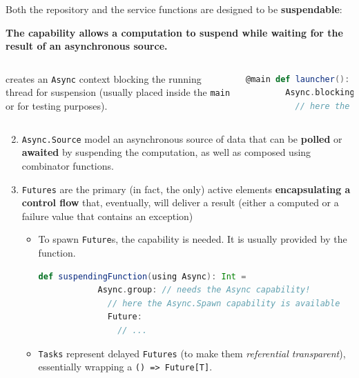 \documentclass[aspectratio=1610,xcolor=dvipsnames,handout]{beamer}
\begin{document}
\begin{frame}[fragile] %
  \small
  Both the repository and the service functions are designed to be \textbf{suspendable}:
  \begin{block}{}
    \textbf{The  capability allows a computation to suspend while waiting for the result of an asynchronous source.}
  \end{block}
  
  \pause
  \begin{columns}
       creates an \texttt{Async} context blocking the running thread for suspension (usually placed inside the \texttt{main} or for testing purposes).
    \begin{lstlisting}[language=scala,gobble=6]
      @main def launcher(): Unit =
        Async.blocking:
          // here the Async capability is available
    \end{lstlisting}
  \end{columns}
\end{frame}
%
\begin{frame}[fragile]
  \begin{block}{}
    \begin{enumerate}
      \setcounter{enumi}{1}
      \item \texttt{Async.Source} model an asynchronous source of data that can be \textbf{polled} or \textbf{awaited} by suspending the computation, as well as composed using combinator functions.
      \item \texttt{Futures} are the primary (in fact, the only) active elements \textbf{encapsulating a control flow} that, eventually, will deliver a result (either a computed or a failure value that contains an exception)
      \begin{itemize}
        \item To spawn \texttt{Future}s, the  capability is needed. It is usually provided by the  function.
        \begin{lstlisting}[language=scala,gobble=10]
          def suspendingFunction(using Async): Int =
            Async.group: // needs the Async capability!
              // here the Async.Spawn capability is available
              Future:
                // ...
        \end{lstlisting}
        \item \texttt{Tasks} represent delayed \texttt{Futures} (to make them \textit{referential transparent}), essentially wrapping a \texttt{() => Future[T]}.
      \end{itemize}
    \end{enumerate}
  \end{block}
\end{frame}
\end{document}
